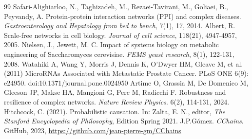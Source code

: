 \documentclass[12pt,a4paper]{report}
\begin{document}
\begin{thebibliography}{99}
Safari-Alighiarloo, N., Taghizadeh, M., Rezaei-Tavirani, M., Goliaei, B., Peyvandy, A. Protein-protein interaction networks (PPI) and complex diseases. \textit{Gastroenterology and Hepatology from bed to bench}, 7(1), 17, 2014.
Albert, R. Scale-free networks in cell biology. \textit{Journal of cell science}, 118(21), 4947-4957, 2005.
Nielsen, J., Jewett, M. C. Impact of systems biology on metabolic engineering of Saccharomyces cerevisiae. \textit{FEMS yeast research}, 8(1), 122-131, 2008.
Watahiki A, Wang Y, Morris J, Dennis K, O'Dwyer HM, Gleave M, et al.(2011) MicroRNAs Associated with Metastatic Prostate Cancer. PLoS ONE 6(9): e24950. doi:10.1371/journal.pone.0024950
Artime O, Grassia M, De Domenico M, Gleeson JP, Makse HA, Mangioni G, Perc M, Radicchi F. Robustness and resilience of complex networks. \textit{Nature Review Physics}. 6(2), 114-131, 2024.
Hitchcock, C. (2021). Probabilistic causation. In: Zalta, E. N., editor, \textit{The Stanford Encyclopedia of Philosophy}, Edition Spring 2021.
J.P.Gómez. \textit{CChains}. GitHub, 2023, \url{https://github.com/jean-pierre-gm/CChains}
\end{thebibliography}
\end{document}
